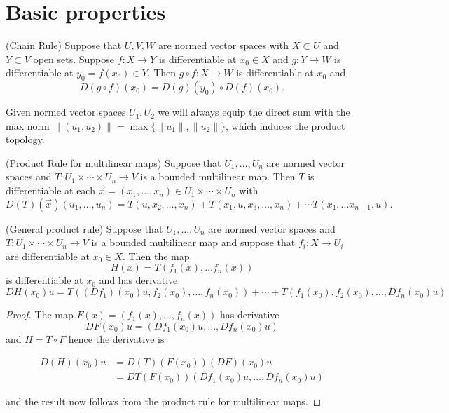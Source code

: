 \documentclass[twoside, a4paper, 10pt]{amsart}
\begin{document}
\section{Basic properties}

\begin{lemma}(Chain Rule) Suppose that $U,V,W$ are normed vector spaces with $X \subset U$ and $Y \subset V$ open sets. Suppose $f:X \to Y$ is differentiable at $x_0 \in X$ and $g:Y \to W$ is differentiable at $y_0 = f(x_0) \in Y$. Then $g \circ f:X \to W$ is differentiable at $x_0$ and $$D(g \circ f)(x_0) = D(g)(y_0) \circ D(f)(x_0).$$ \end{lemma}

Given normed vector spaces $U_1, U_2$ we will always equip the direct sum with the max norm $\|(u_1, u_2)\| = \max \{\|u_1\|, \|u_2 \| \}$, which induces the product topology.

\begin{lemma}(Product Rule for multilinear maps) Suppose that $U_1, \ldots, U_n$ are normed vector spaces and $T: U_1 \times \cdots \times U_n \to V$ is a bounded multilinear map. Then $T$ is differentiable at each $\vec{x} = (x_1, \ldots, x_n) \in U_1 \times \cdots \times U_n $ with $$D(T)(\vec{x})(u_1, \ldots, u_n) = T(u, x_2, \ldots, x_n) + T(x_1, u, x_3, \ldots, x_n) + \cdots T(x_1, \ldots x_{n-1}, u). $$\end{lemma}

\begin{lemma}(General product rule)  Suppose that $U_1, \ldots, U_n$ are normed vector spaces and $T: U_1 \times \cdots \times U_n \to V$ is a bounded multilinear map and suppose that $f_i:X \to U_i$ are differentiable at $x_0 \in X$. Then the map $$ H(x) = T(f_1(x), \ldots f_n(x)) $$ is differentiable at $x_0$ and has derivative $$DH(x_0)u = T((Df_1)(x_0)u, f_2(x_0), \ldots, f_n(x_0)) + \cdots + T(f_1(x_0), f_2(x_0), \ldots, Df_n(x_0)u)$$\end{lemma}

\begin{proof} The map $F(x)=(f_1(x), \ldots, f_n(x))$ has derivative $$DF(x_0)u =(Df_1(x_0)u, \ldots, Df_n(x_0)u)$$ and $H = T \circ F$ hence the derivative is 

\begin{align*} D(H)(x_0)u &= D(T)(F(x_0))(DF)(x_0)u \\ &= DT(F(x_0)) (Df_1(x_0)u, \ldots, Df_n(x_0)u)  \end{align*}

and the result now follows from the product rule for multilinear maps.

 \end{proof}
\end{document}

